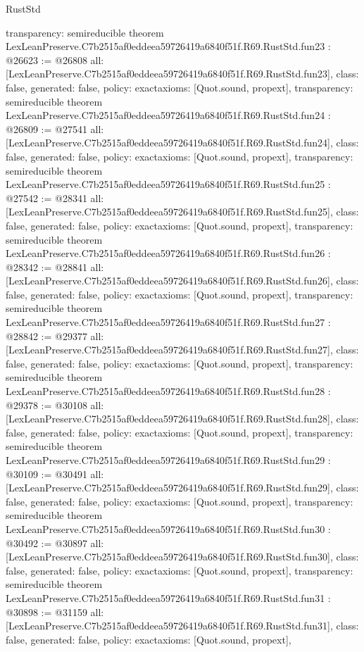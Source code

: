 \begin{lexlean}{RustStd}
\begin{coremodule}
{  transparency: semireducible
}
theorem LexLeanPreserve.C7b2515af0eddeea59726419a6840f51f.R69.RustStd.fun23 : @26623 := @26808 {
  all: [LexLeanPreserve.C7b2515af0eddeea59726419a6840f51f.R69.RustStd.fun23],
  class: false,
  generated: false,
  policy: exact{axioms: [Quot.sound, propext]},
  transparency: semireducible
}
theorem LexLeanPreserve.C7b2515af0eddeea59726419a6840f51f.R69.RustStd.fun24 : @26809 := @27541 {
  all: [LexLeanPreserve.C7b2515af0eddeea59726419a6840f51f.R69.RustStd.fun24],
  class: false,
  generated: false,
  policy: exact{axioms: [Quot.sound, propext]},
  transparency: semireducible
}
theorem LexLeanPreserve.C7b2515af0eddeea59726419a6840f51f.R69.RustStd.fun25 : @27542 := @28341 {
  all: [LexLeanPreserve.C7b2515af0eddeea59726419a6840f51f.R69.RustStd.fun25],
  class: false,
  generated: false,
  policy: exact{axioms: [Quot.sound, propext]},
  transparency: semireducible
}
theorem LexLeanPreserve.C7b2515af0eddeea59726419a6840f51f.R69.RustStd.fun26 : @28342 := @28841 {
  all: [LexLeanPreserve.C7b2515af0eddeea59726419a6840f51f.R69.RustStd.fun26],
  class: false,
  generated: false,
  policy: exact{axioms: [Quot.sound, propext]},
  transparency: semireducible
}
theorem LexLeanPreserve.C7b2515af0eddeea59726419a6840f51f.R69.RustStd.fun27 : @28842 := @29377 {
  all: [LexLeanPreserve.C7b2515af0eddeea59726419a6840f51f.R69.RustStd.fun27],
  class: false,
  generated: false,
  policy: exact{axioms: [Quot.sound, propext]},
  transparency: semireducible
}
theorem LexLeanPreserve.C7b2515af0eddeea59726419a6840f51f.R69.RustStd.fun28 : @29378 := @30108 {
  all: [LexLeanPreserve.C7b2515af0eddeea59726419a6840f51f.R69.RustStd.fun28],
  class: false,
  generated: false,
  policy: exact{axioms: [Quot.sound, propext]},
  transparency: semireducible
}
theorem LexLeanPreserve.C7b2515af0eddeea59726419a6840f51f.R69.RustStd.fun29 : @30109 := @30491 {
  all: [LexLeanPreserve.C7b2515af0eddeea59726419a6840f51f.R69.RustStd.fun29],
  class: false,
  generated: false,
  policy: exact{axioms: [Quot.sound, propext]},
  transparency: semireducible
}
theorem LexLeanPreserve.C7b2515af0eddeea59726419a6840f51f.R69.RustStd.fun30 : @30492 := @30897 {
  all: [LexLeanPreserve.C7b2515af0eddeea59726419a6840f51f.R69.RustStd.fun30],
  class: false,
  generated: false,
  policy: exact{axioms: [Quot.sound, propext]},
  transparency: semireducible
}
theorem LexLeanPreserve.C7b2515af0eddeea59726419a6840f51f.R69.RustStd.fun31 : @30898 := @31159 {
  all: [LexLeanPreserve.C7b2515af0eddeea59726419a6840f51f.R69.RustStd.fun31],
  class: false,
  generated: false,
  policy: exact{axioms: [Quot.sound, propext]},
}
\end{coremodule}
\end{lexlean}
